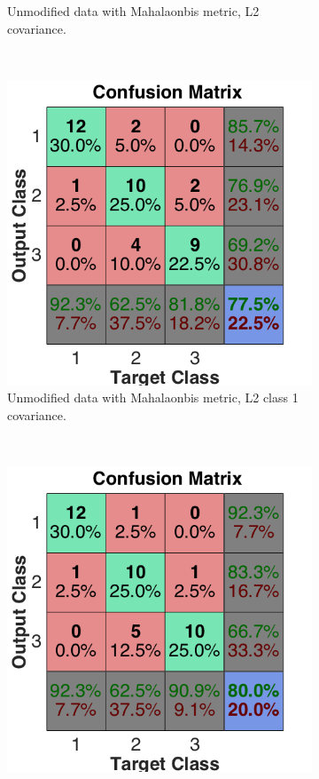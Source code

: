 \documentclass[a4paper, 10pt, conference]{ieeeconf}
\begin{document}
\begin{figure}[!ht]
\begin{subfigure}{0.32\textwidth}
      \caption{Unmodified data with Mahalaonbis metric, L2 covariance.}
    \end{subfigure}
    \\
    \begin{subfigure}{0.32\textwidth}
      \includegraphics[width=\textwidth]{pic/unmod_cov_l2_class1.png}
      \caption{Unmodified data with Mahalaonbis metric, L2 class 1 covariance.}
    \end{subfigure}
    ~
    \begin{subfigure}{0.32\textwidth}
      \includegraphics[width=\textwidth]{pic/unmod_cov_l2_class2.png}

\end{subfigure}
\end{figure}
\end{document}
